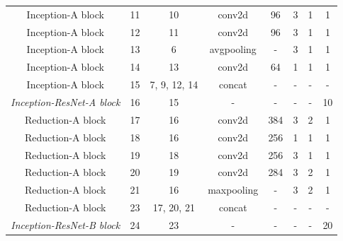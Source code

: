 \documentclass[12pt]{article}
\numberwithin{equation}{section}
\numberwithin{figure}{section}
\begin{document}
\begin{table}[H]
{\begin{tabular}{c|c|c|c|c|c|c|c}
	Inception-A block                 & 11               & 10             & conv2d            & 96               & 3              & 1                      & 1          \\
	Inception-A block                 & 12               & 11             & conv2d            & 96               & 3              & 1                      & 1          \\
	Inception-A block                 & 13               & 6              & avgpooling        & -                & 3              & 1                      & 1          \\
	Inception-A block                 & 14               & 13             & conv2d            & 64               & 1              & 1                      & 1          \\
	Inception-A block                 & 15               & 7, 9, 12, 14   & concat            & -                & -              & -                      & -          \\\hdashline
	\textit{Inception-ResNet-A block} & 16               & 15             & -                 & -                & -              & -                      & 10         \\\hdashline
	Reduction-A block                 & 17               & 16             & conv2d            & 384              & 3              & 2                      & 1          \\
	Reduction-A block                 & 18               & 16             & conv2d            & 256              & 1              & 1                      & 1          \\
	Reduction-A block                 & 19               & 18             & conv2d            & 256              & 3              & 1                      & 1          \\
	Reduction-A block                 & 20               & 19             & conv2d            & 284              & 3              & 2                      & 1          \\
	Reduction-A block                 & 21               & 16             & maxpooling        & -                & 3              & 2                      & 1          \\
	Reduction-A block                 & 23               & 17, 20, 21     & concat            & -                & -              & -                      & -          \\\hdashline
	\textit{Inception-ResNet-B block} & 24               & 23             & -                 & -                & -              & -                      & 20         \\

\end{tabular}}
\end{table}
\end{document}
